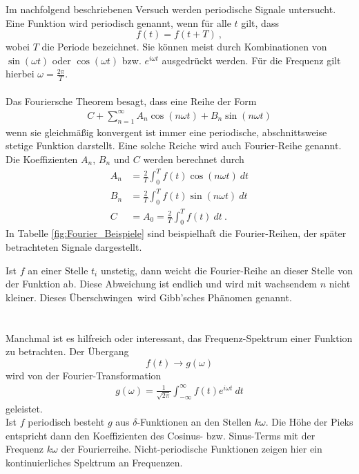 Im nachfolgend beschriebenen Versuch werden periodische Signale untersucht. \\
Eine Funktion wird periodisch genannt, wenn für alle $t$ gilt, dass
\[ f(t) = f(t+T) \ , \]
wobei $T$ die Periode bezeichnet. Sie können meist durch Kombinationen von $\sin(\omega t)$ oder $\cos(\omega t)$ bzw. $e^{i\omega t}$ ausgedrückt werden. Für die Frequenz gilt hierbei $\omega = \frac{2\pi}{T} $. \\
\ \\
Das Fouriersche Theorem besagt, dass eine Reihe der Form
\begin{align}
	C + \sum_{n = 1}^{\infty} A_n\cos(n\omega t)+B_n\sin(n\omega t)
\end{align}
wenn sie gleichmäßig konvergent ist immer eine periodische, abschnittsweise stetige Funktion darstellt. Eine solche Reiche wird auch Fourier-Reihe genannt. Die Koeffizienten $A_n$, $B_n$ und $C$ werden berechnet durch
\begin{align}
	A_n &= \frac{2}{T}\int_0^T f(t)\cos(n\omega t)\ dt \\
	B_n &= \frac{2}{T}\int_0^T f(t)\sin(n\omega t)\ dt \\
	C &= A_0 = \frac{2}{T}\int_0^Tf(t)\ dt \ .
\end{align}
In Tabelle \ref{fig:Fourier_Beispiele} sind beispielhaft die Fourier-Reihen, der später betrachteten Signale dargestellt.

Ist $f$ an einer Stelle $t_i$ unstetig, dann weicht die Fourier-Reihe an dieser Stelle von der Funktion ab. Diese Abweichung ist endlich und wird mit wachsendem $n$ nicht kleiner. Dieses \glqq Überschwingen\grqq\ wird Gibb'sches Phänomen genannt. \\
\ \\
\ \\
Manchmal ist es hilfreich oder interessant, das Frequenz-Spektrum einer Funktion zu betrachten. Der Übergang
\[ f(t)\rightarrow g(\omega) \]
wird von der Fourier-Transformation
\begin{align}
	g(\omega) = \frac{1}{\sqrt{2\pi}}\int_{-\infty}^{\infty}f(t)e^{i\omega t}\ dt
\end{align}
geleistet. \\
Ist $f$ periodisch besteht $g$ aus $\delta$-Funktionen an den Stellen $k\omega$. Die Höhe der Pieks entspricht dann den Koeffizienten des Cosinus- bzw. Sinus-Terms mit der Frequenz $k\omega$ der Fourierreihe. Nicht-periodische Funktionen zeigen hier ein kontinuierliches Spektrum an Frequenzen.